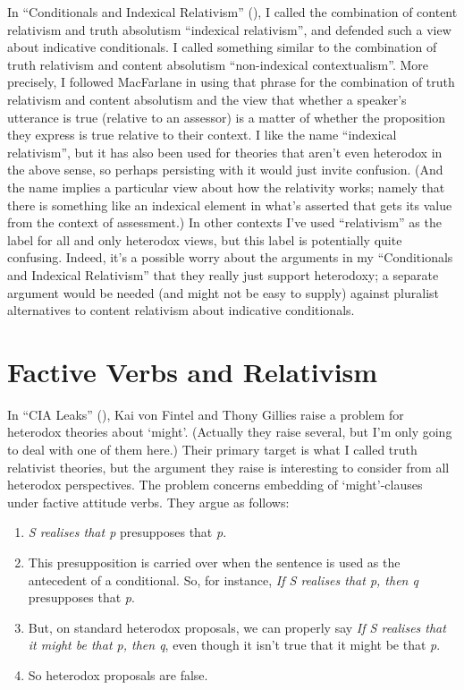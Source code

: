 \documentclass[
  10pt,
  letterpaper,
  DIV=11,
  numbers=noendperiod,
  twoside]{scrartcl}
\providecommand{\tightlist}{%
  \setlength{\itemsep}{0pt}\setlength{\parskip}{0pt}}\usepackage{longtable,booktabs,array}
\begin{document}
In ``Conditionals and Indexical Relativism''
(), I called the
combination of content relativism and truth absolutism ``indexical
relativism'', and defended such a view about indicative conditionals. I
called something similar to the combination of truth relativism and
content absolutism ``non-indexical contextualism''. More precisely, I
followed MacFarlane in using that phrase for the combination of truth
relativism and content absolutism and the view that whether a speaker's
utterance is true (relative to an assessor) is a matter of whether the
proposition they express is true relative to their context. I like the
name ``indexical relativism'', but it has also been used for theories
that aren't even heterodox in the above sense, so perhaps persisting
with it would just invite confusion. (And the name implies a particular
view about how the relativity works; namely that there is something like
an indexical element in what's asserted that gets its value from the
context of assessment.) In other contexts I've used ``relativism'' as
the label for all and only heterodox views, but this label is
potentially quite confusing. Indeed, it's a possible worry about the
arguments in my ``Conditionals and Indexical Relativism'' that they
really just support heterodoxy; a separate argument would be needed (and
might not be easy to supply) against pluralist alternatives to content
relativism about indicative conditionals.

\section{Factive Verbs and
Relativism}\label{factive-verbs-and-relativism}

In ``CIA Leaks'' (), Kai von Fintel and Thony Gillies raise a problem for heterodox
theories about `might'. (Actually they raise several, but I'm only going
to deal with one of them here.) Their primary target is what I called
truth relativist theories, but the argument they raise is interesting to
consider from all heterodox perspectives. The problem concerns embedding
of `might'-clauses under factive attitude verbs. They argue as follows:

\begin{enumerate}
\def\labelenumi{\arabic{enumi}.}
\tightlist
\item
  \emph{S realises that p} presupposes that \emph{p}.
\item
  This presupposition is carried over when the sentence is used as the
  antecedent of a conditional. So, for instance, \emph{If S realises
  that p, then q} presupposes that \emph{p}.
\item
  But, on standard heterodox proposals, we can properly say \emph{If S
  realises that it might be that p, then q}, even though it isn't true
  that it might be that \emph{p}.
\item
  So heterodox proposals are false.
\end{enumerate}
\end{document}

